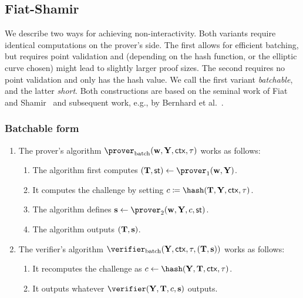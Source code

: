\documentclass[runningheads,11pt]{article}
\begin{document}
\subsection{Fiat-Shamir}
We describe two ways for achieving non-interactivity. Both variants require identical computations on the prover's side.
The first allows for efficient batching, but requires point validation and (depending on the hash function, or the elliptic curve chosen) might lead to
slightly larger proof sizes. The second requires no point validation and only has the hash value.
We call the first variant \emph{batchable}, and the latter \emph{short}.
Both constructions are based on the seminal work of Fiat and Shamir~\cite{C:FiaSha86} and subsequent work, e.g., by Bernhard et al.~\cite{AC:BerPerWar12}.



\subsubsection{Batchable form}


\begin{enumerate}
  \item
    The prover's algorithm $\batchprover(\vec \witness, \vec \statement,\ctx, \stag)$ works as follows:
    \begin{enumerate}
      \item
        The algorithm first computes $(\vec \commitment,\st)\gets\prover_1(\vec \witness, \vec \statement)$.
      \item
        It computes the challenge by setting $c\defeq\hash(\vec \commitment, \vec \statement,\ctx, \stag)$.
      \item
        The algorithm defines $\vec \response\gets\prover_2(\vec \witness, \vec \statement,\challenge,\st)$.
      \item
        The algorithm outputs $(\mathbf {T}, \mathbf {s})$.
    \end{enumerate}
  \item
    The verifier's algorithm $\batchverifier(\vec \statement, \ctx, \stag, (\vec \commitment,\vec s))$ works as follows:
    \begin{enumerate}
      \item
        It recomputes the challenge as $c\gets\hash(\vec \statement, \vec \commitment, \ctx, \stag)$.
      \item
        It outputs whatever $\verifier(\vec \statement,\vec \commitment,\challenge,\vec \response)$ outputs.
    \end{enumerate}
\end{enumerate}
\end{document}
